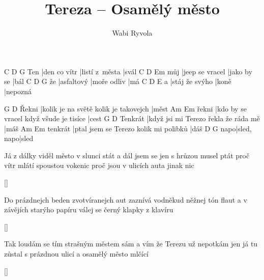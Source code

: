 \documentclass{song}
\title{Tereza -- Osamělý město}
\author{Wabi Ryvola}
\begin{document}
\strophe
    C            D              G
Ten |den co vítr |listí z~města |svál
    C               D			Em
můj |jeep se vracel |jako by se |bál
   C		  D			  G
že |asfaltový |moře odliv |má
  C				 D	   E
a |stáj že svýho |koně |nepozná
\endstrophe

	  G										D
Řekni |kolik je na světě kolik je takovejch |měst
      Am									 Em
řekni |kdo by se vracel když všude je tisíce |cest
		G									 D
Tenkrát |když jsi mi Terezo řekla že ráda mě |máš
		Am									  Em
tenkrát |ptal jsem se Terezo kolik mi polibků |dáš
    D		   G
napo|sled, napo|sled
\endstrophe

\strophe*
Já z dálky viděl město v slunci stát
a dál jsem se jen s hrůzou musel ptát
proč vítr mlátí spoustou vokenic
proč jsou v ulicích auta jinak nic
\endstrophe

\ref{}

\strophe*
Do prázdnejch beden zvotvíranejch aut
zaznívá vodněkud něžnej tón flaut
a v závějích starýho papíru
válej se černý klapky z klavíru
\endstrophe

\ref{}

\strophe*
Tak loudám se tím strašným městem sám
a vím že Terezu už nepotkám
jen já tu zůstal s prázdnou ulicí
a osamělý město mlčící
\endstrophe

\ref{}
\end{document}
